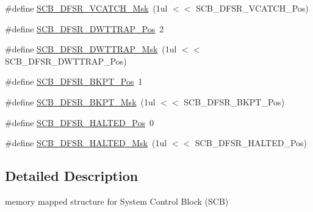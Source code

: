 \begin{DoxyCompactItemize}
\item 
\#define \hyperlink{group___c_m_s_i_s___c_m3___s_c_b_gacbb931575c07b324ec793775b7c44d05}{S\-C\-B\-\_\-\-D\-F\-S\-R\-\_\-\-V\-C\-A\-T\-C\-H\-\_\-\-Msk}~(1ul $<$$<$ S\-C\-B\-\_\-\-D\-F\-S\-R\-\_\-\-V\-C\-A\-T\-C\-H\-\_\-\-Pos)
\item 
\#define \hyperlink{group___c_m_s_i_s___c_m3___s_c_b_gaccf82364c6d0ed7206f1084277b7cc61}{S\-C\-B\-\_\-\-D\-F\-S\-R\-\_\-\-D\-W\-T\-T\-R\-A\-P\-\_\-\-Pos}~2
\item 
\#define \hyperlink{group___c_m_s_i_s___c_m3___s_c_b_ga3f7384b8a761704655fd45396a305663}{S\-C\-B\-\_\-\-D\-F\-S\-R\-\_\-\-D\-W\-T\-T\-R\-A\-P\-\_\-\-Msk}~(1ul $<$$<$ S\-C\-B\-\_\-\-D\-F\-S\-R\-\_\-\-D\-W\-T\-T\-R\-A\-P\-\_\-\-Pos)
\item 
\#define \hyperlink{group___c_m_s_i_s___c_m3___s_c_b_gaf28fdce48655f0dcefb383aebf26b050}{S\-C\-B\-\_\-\-D\-F\-S\-R\-\_\-\-B\-K\-P\-T\-\_\-\-Pos}~1
\item 
\#define \hyperlink{group___c_m_s_i_s___c_m3___s_c_b_ga609edf8f50bc49adb51ae28bcecefe1f}{S\-C\-B\-\_\-\-D\-F\-S\-R\-\_\-\-B\-K\-P\-T\-\_\-\-Msk}~(1ul $<$$<$ S\-C\-B\-\_\-\-D\-F\-S\-R\-\_\-\-B\-K\-P\-T\-\_\-\-Pos)
\item 
\#define \hyperlink{group___c_m_s_i_s___c_m3___s_c_b_gaef4ec28427f9f88ac70a13ae4e541378}{S\-C\-B\-\_\-\-D\-F\-S\-R\-\_\-\-H\-A\-L\-T\-E\-D\-\_\-\-Pos}~0
\item 
\#define \hyperlink{group___c_m_s_i_s___c_m3___s_c_b_ga200bcf918d57443b5e29e8ce552e4bdf}{S\-C\-B\-\_\-\-D\-F\-S\-R\-\_\-\-H\-A\-L\-T\-E\-D\-\_\-\-Msk}~(1ul $<$$<$ S\-C\-B\-\_\-\-D\-F\-S\-R\-\_\-\-H\-A\-L\-T\-E\-D\-\_\-\-Pos)
\end{DoxyCompactItemize}


\subsection{Detailed Description}
memory mapped structure for System Control Block (S\-C\-B) 


